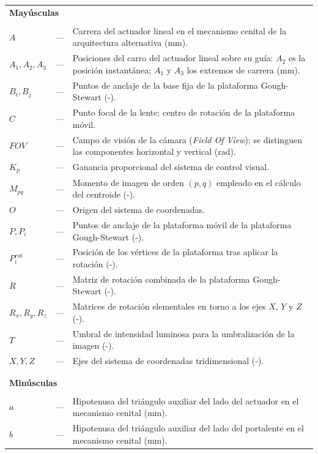 
\begin{longtable}{lcp{} }
\multicolumn{3}{l}{\textbf{Mayúsculas}}\\
\\
$A$        & --- & Carrera del actuador lineal en el mecanismo cenital de la arquitectura alternativa (mm).\\
$A_1,A_2,A_3$ & --- & Posiciones del carro del actuador lineal sobre su guía: $A_2$ es la posición instantánea; $A_1$ y $A_3$ los extremos de carrera (mm).\\
$B_i,B_j$  & --- & Puntos de anclaje de la base fija de la plataforma Gough-Stewart (-).\\
$C$        & --- & Punto focal de la lente; centro de rotación de la plataforma móvil.\\
$FOV$      & --- & Campo de visión de la cámara (\emph{Field Of View}); se distinguen las componentes horizontal y vertical (rad).\\
$K_p$      & --- & Ganancia proporcional del sistema de control visual.\\
$M_{pq}$   & --- & Momento de imagen de orden $(p,q)$ empleado en el cálculo del centroide (-).\\
$O$        & --- & Origen del sistema de coordenadas.\\
$P,P_i$    & --- & Puntos de anclaje de la plataforma móvil de la plataforma Gough-Stewart (-).\\
$P_i^{rot}$ & --- & Posición de los vértices de la plataforma tras aplicar la rotación (-).\\
$R$        & --- & Matriz de rotación combinada de la plataforma Gough-Stewart (-).\\
$R_x,R_y,R_z$ & --- & Matrices de rotación elementales en torno a los ejes $X$, $Y$ y $Z$ (-).\\
$T$        & --- & Umbral de intensidad luminosa para la umbralización de la imagen (-).\\
$X,Y,Z$    & --- & Ejes del sistema de coordenadas tridimensional (-).\\
\\
\\
\multicolumn{3}{l}{\textbf{Minúsculas}}\\
\\
$a$        & --- & Hipotenusa del triángulo auxiliar del lado del actuador en el mecanismo cenital (mm).\\
$b$        & --- & Hipotenusa del triángulo auxiliar del lado del portalente en el mecanismo cenital (mm).\\

\end{longtable}
